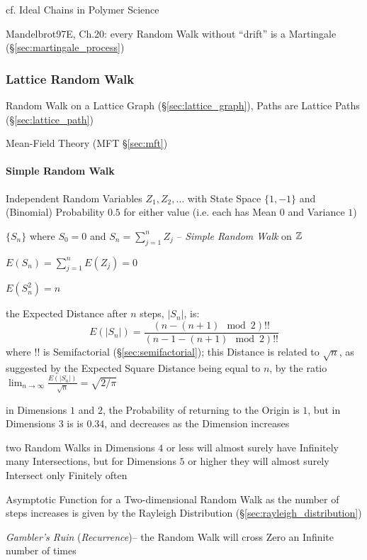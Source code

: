 cf. Ideal Chains in Polymer Science

Mandelbrot97E, Ch.20: every Random Walk without ``drift'' is a Martingale
(\S\ref{sec:martingale_process})



\subsubsection{Lattice Random Walk}\label{sec:lattice_random_walk}

Random Walk on a Lattice Graph (\S\ref{sec:lattice_graph}), Paths are Lattice
Paths (\S\ref{sec:lattice_path})

\fist Mean-Field Theory (MFT \S\ref{sec:mft})



\paragraph{Simple Random Walk}\label{sec:simple_random_walk}\hfill

Independent Random Variables $Z_1, Z_2, \ldots$ with State Space $\{1, -1\}$ and
(Binomial) Probability $0.5$ for either value (i.e. each has Mean $0$ and
Variance $1$)

$\{ S_n \}$ where $S_0 = 0$ and $S_n = \sum_{j=1}^n Z_j$ --
\emph{Simple Random Walk} on $\mathbb{Z}$

$E(S_n) = \sum_{j=1}^n E(Z_j) = 0$

$E(S_n^2) = n$

the Expected Distance after $n$ steps, $|S_n|$, is:
\[
  E(|S_n|) = \frac{(n - (n+1)\mod{2})!!}{(n - 1 - (n+1)\mod{2})!!}
\]
where $!!$ is Semifactorial (\S\ref{sec:semifactorial}); this Distance is
related to $\sqrt{n}$, as suggested by the Expected Square Distance being equal
to $n$, by the ratio
$\lim_{n\to\infty} \frac{E(|S_n|)}{\sqrt{n}} = \sqrt{2/\pi}$

in Dimensions $1$ and $2$, the Probability of returning to the Origin is $1$,
but in Dimensions $3$ is is $0.34$, and decreases as the Dimension increases

two Random Walks in Dimensions $4$ or less will almost surely have Infinitely
many Intersections, but for Dimensions $5$ or higher they will almost surely
Intersect only Finitely often

Asymptotic Function for a Two-dimensional Random Walk as the number of steps
increases is given by the Rayleigh Distribution
(\S\ref{sec:rayleigh_distribution})

\emph{Gambler's Ruin} (\emph{Recurrence})-- the Random Walk will cross Zero an
Infinite number of times

